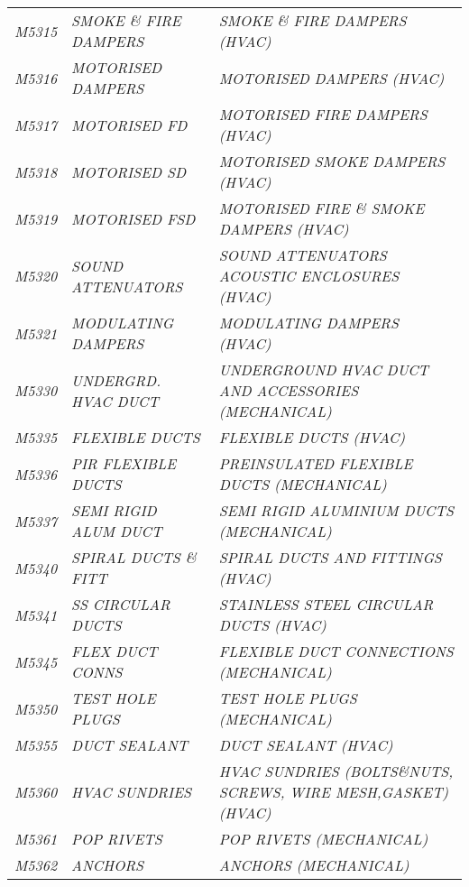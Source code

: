 \begin{landscape}
\begin{longtable}[l]{l%
                  l|%
                  l|}
\itshape M5315       &\itshape SMOKE \& FIRE DAMPERS   &\itshape SMOKE \& FIRE DAMPERS (HVAC)   \\
\itshape M5316       &\itshape MOTORISED DAMPERS   &\itshape MOTORISED DAMPERS (HVAC)   \\
\itshape M5317       &\itshape MOTORISED FD   &\itshape MOTORISED FIRE DAMPERS (HVAC)   \\
\itshape M5318       &\itshape MOTORISED SD   &\itshape MOTORISED SMOKE DAMPERS (HVAC)   \\
\itshape M5319       &\itshape MOTORISED FSD   &\itshape MOTORISED FIRE \& SMOKE DAMPERS (HVAC)   \\
\itshape M5320       &\itshape SOUND ATTENUATORS   &\itshape SOUND ATTENUATORS ACOUSTIC ENCLOSURES (HVAC)   \\
\itshape M5321       &\itshape MODULATING DAMPERS   &\itshape MODULATING DAMPERS (HVAC)   \\
\itshape M5330       &\itshape UNDERGRD. HVAC DUCT   &\itshape UNDERGROUND HVAC DUCT AND ACCESSORIES (MECHANICAL)   \\
\itshape M5335       &\itshape FLEXIBLE DUCTS   &\itshape FLEXIBLE DUCTS (HVAC)   \\
\itshape M5336       &\itshape PIR FLEXIBLE DUCTS   &\itshape PREINSULATED FLEXIBLE DUCTS (MECHANICAL)   \\
\itshape M5337       &\itshape SEMI RIGID ALUM DUCT   &\itshape SEMI RIGID ALUMINIUM DUCTS (MECHANICAL)   \\
\itshape M5340       &\itshape SPIRAL DUCTS \& FITT   &\itshape SPIRAL DUCTS AND FITTINGS (HVAC)   \\
\itshape M5341       &\itshape SS CIRCULAR DUCTS   &\itshape STAINLESS STEEL CIRCULAR DUCTS (HVAC)   \\
\itshape M5345       &\itshape FLEX DUCT CONNS   &\itshape FLEXIBLE DUCT CONNECTIONS (MECHANICAL)   \\
\itshape M5350       &\itshape TEST HOLE PLUGS   &\itshape TEST HOLE PLUGS (MECHANICAL)   \\
\itshape M5355       &\itshape DUCT SEALANT   &\itshape DUCT SEALANT (HVAC)   \\
\itshape M5360       &\itshape HVAC SUNDRIES   &\itshape HVAC SUNDRIES (BOLTS\&NUTS, SCREWS, WIRE MESH,GASKET) (HVAC)   \\
\itshape M5361       &\itshape POP RIVETS   &\itshape POP RIVETS (MECHANICAL)   \\
\itshape M5362       &\itshape ANCHORS   &\itshape ANCHORS (MECHANICAL)   \\

\end{longtable}
\end{landscape}
